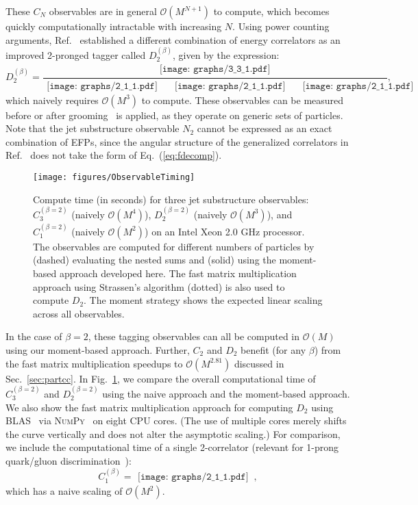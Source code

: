\documentclass[aps,prd,floatfix,preprintnumbers,twocolumn,groupedaddress,nofootinbib,longbibliography,10pt]{revtex4-1}
\renewcommand{\O}{\mathcal{O}}
\DeclareRobustCommand{\Sec}[1]{Sec.~\ref{#1}}
\DeclareRobustCommand{\Fig}[1]{Fig.~\ref{#1}}
\DeclareRobustCommand{\Eq}[1]{Eq.~(\ref{#1})}
\DeclareRobustCommand{\Ref}[1]{Ref.~\cite{#1}}
\DeclareRobustCommand{\linegraph}[1]{\begin{gathered}\texttt{[image: graphs/2\_1\_1.pdf]}\end{gathered}}
\DeclareRobustCommand{\triangle}[1]{\begin{gathered}\texttt{[image: graphs/3\_3\_1.pdf]}\end{gathered}}
\begin{document}
These $C_N$ observables are in general $\mathcal O(M^{N+1})$ to compute, which becomes quickly computationally intractable with increasing $N$.
%
Using power counting arguments, \Ref{Larkoski:2014gra} established a different combination of energy correlators as an improved 2-pronged tagger called $D_2^{(\beta)}$, given by the expression:
%
\begin{equation}
D_2^{(\beta)} = \frac{\triangle{0.14}}{\linegraph{0.12}\quad \linegraph{0.12}\quad \linegraph{0.12}},
\end{equation}
%
which naively requires $\mathcal O(M^3)$ to compute.
%
These observables can be measured before or after grooming~\cite{Krohn:2009th,Ellis:2009me,Ellis:2009su,Dasgupta:2013ihk,Larkoski:2014wba} is applied, as they operate on generic sets of particles.
%
Note that the jet substructure observable $N_2$ cannot be expressed as an exact combination of EFPs, since the angular structure of the generalized correlators in \Ref{Moult:2016cvt} does not take the form of \Eq{eq:fdecomp}.


\begin{figure}[t]
\centering
\texttt{[image: figures/ObservableTiming]}
\caption{
\label{fig:compspeed}
%
Compute time (in seconds) for three jet substructure observables: $C_3^{(\beta=2)}$ (naively $\O(M^4)$), $D_2^{(\beta=2)}$ (naively $\O(M^3)$), and $C_1^{(\beta=2)}$ (naively $\O(M^2)$) on an Intel Xeon 2.0 GHz processor.
%
The observables are computed for different numbers of particles by (dashed) evaluating the nested sums and (solid) using the moment-based approach developed here.
%
The fast matrix multiplication approach using Strassen's algorithm (dotted) is also used to compute $D_2$.
%
The moment strategy shows the expected linear scaling across all observables.
}
\end{figure}


In the case of $\beta=2$, these tagging observables can all be computed in $\mathcal O(M)$ using our moment-based approach.
%
Further, $C_2$ and $D_2$ benefit (for any $\beta$) from the fast matrix multiplication speedups to $\mathcal O(M^{2.81})$ discussed in \Sec{sec:partcc}.
%
In \Fig{fig:compspeed}, we compare the overall computational time of $C_3^{(\beta=2)}$ and $D_2^{(\beta=2)}$ using the naive approach and the moment-based approach.
%
We also show the fast matrix multiplication approach for computing $D_2$ using \textsc{BLAS}~\cite{blackford2002updated} via \textsc{NumPy}~\cite{numpycite,numpyweb} on eight CPU cores.
%
(The use of multiple cores merely shifts the curve vertically and does not alter the asymptotic scaling.)
%
For comparison, we include the computational time of a single 2-correlator (relevant for 1-prong quark/gluon discrimination~\cite{Larkoski:2014gra}):
%
\begin{equation}
C^{(\beta)}_1 =\linegraph{0.12} \,,
\end{equation}
%
which has a naive scaling of $\O(M^2)$.
\end{document}
